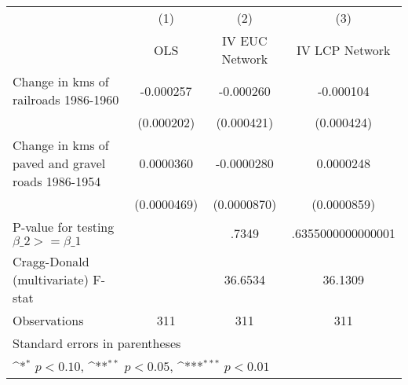 {
\def\sym#1{\ifmmode^{#1}\else\(^{#1}\)\fi}
\begin{tabular}{l*{3}{c}}
\hline\hline
                &\multicolumn{1}{c}{(1)}&\multicolumn{1}{c}{(2)}&\multicolumn{1}{c}{(3)}\\
                &\multicolumn{1}{c}{OLS}&\multicolumn{1}{c}{IV EUC Network}&\multicolumn{1}{c}{IV LCP Network}\\
\hline
Change in kms of railroads 1986-1960&-0.000257         &-0.000260         &-0.000104         \\
                &(0.000202)         &(0.000421)         &(0.000424)         \\
[1em]
Change in kms of paved and gravel roads 1986-1954&0.0000360         &-0.0000280         &0.0000248         \\
                &(0.0000469)         &(0.0000870)         &(0.0000859)         \\
\hline
P-value for testing $\beta\_{2} >= \beta\_{1}$&                  &    .7349         &.6355000000000001         \\
Cragg-Donald (multivariate) F-stat&                  &  36.6534         &  36.1309         \\
Observations    &      311         &      311         &      311         \\
\hline\hline
\multicolumn{4}{l}{\footnotesize Standard errors in parentheses}\\
\multicolumn{4}{l}{\footnotesize \sym{*} \(p<0.10\), \sym{**} \(p<0.05\), \sym{***} \(p<0.01\)}\\
\end{tabular}
}
